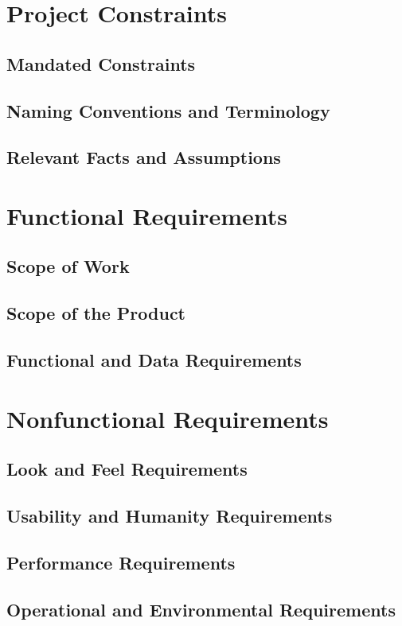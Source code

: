 \documentclass[12pt]{article}
\begin{document}
\section{Project Constraints}
\subsection{Mandated Constraints}
\subsection{Naming Conventions and Terminology}
\subsection{Relevant Facts and Assumptions}

\section{Functional Requirements}
\subsection{Scope of Work}
\subsection{Scope of the Product}
\subsection{Functional and Data Requirements}

\section{Nonfunctional Requirements}
\subsection{Look and Feel Requirements}
\subsection{Usability and Humanity Requirements}
\subsection{Performance Requirements}
\subsection{Operational and Environmental Requirements}
\end{document}
